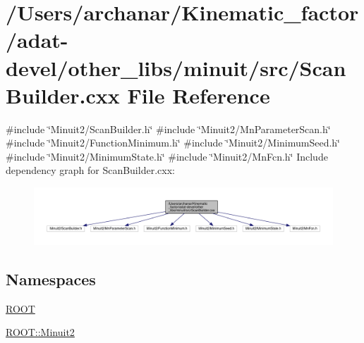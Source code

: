 \hypertarget{adat-devel_2other__libs_2minuit_2src_2ScanBuilder_8cxx}{}\section{/\+Users/archanar/\+Kinematic\+\_\+factor/adat-\/devel/other\+\_\+libs/minuit/src/\+Scan\+Builder.cxx File Reference}
\label{adat-devel_2other__libs_2minuit_2src_2ScanBuilder_8cxx}
{\ttfamily \#include \char`\"{}Minuit2/\+Scan\+Builder.\+h\char`\"{}}\newline
{\ttfamily \#include \char`\"{}Minuit2/\+Mn\+Parameter\+Scan.\+h\char`\"{}}\newline
{\ttfamily \#include \char`\"{}Minuit2/\+Function\+Minimum.\+h\char`\"{}}\newline
{\ttfamily \#include \char`\"{}Minuit2/\+Minimum\+Seed.\+h\char`\"{}}\newline
{\ttfamily \#include \char`\"{}Minuit2/\+Minimum\+State.\+h\char`\"{}}\newline
{\ttfamily \#include \char`\"{}Minuit2/\+Mn\+Fcn.\+h\char`\"{}}\newline
Include dependency graph for Scan\+Builder.\+cxx\+:
\nopagebreak
\begin{figure}[H]
\begin{center}
\leavevmode
\includegraphics[width=350pt]{dc/df2/adat-devel_2other__libs_2minuit_2src_2ScanBuilder_8cxx__incl}
\end{center}
\end{figure}
\subsection*{Namespaces}
\begin{DoxyCompactItemize}
\item 
 \mbox{\hyperlink{namespaceROOT}{R\+O\+OT}}
\item 
 \mbox{\hyperlink{namespaceROOT_1_1Minuit2}{R\+O\+O\+T\+::\+Minuit2}}
\end{DoxyCompactItemize}
